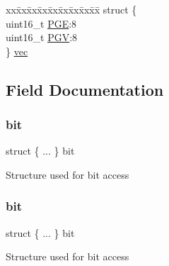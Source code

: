\begin{DoxyCompactItemize}
\begin{tabbing}
\end{tabbing}\item 
\begin{tabbing}
xx\=xx\=xx\=xx\=xx\=xx\=xx\=xx\=xx\=\kill
struct \{\\
\>uint16\_t \mbox{\hyperlink{union_t_c_c___p_a_t_t___type_ab341e20d9b809d928401d2394db56ce0}{PGE}}:8\\
\>uint16\_t \mbox{\hyperlink{union_t_c_c___p_a_t_t___type_af21d899ca984d45bb3d0ea03b889c773}{PGV}}:8\\
\} \mbox{\hyperlink{union_t_c_c___p_a_t_t___type_a2d12389f004832d3435d45c62a830574}{vec}}\\

\end{tabbing}\end{DoxyCompactItemize}


\subsection{Field Documentation}
\mbox{\label{union_t_c_c___p_a_t_t___type_aa8d6a3e59d8a67f22246a420170fe035}} 
\subsubsection{\texorpdfstring{bit}{bit}\hspace{0.1cm}{\footnotesize\ttfamily [1/2]}}
{\footnotesize\ttfamily struct \{ ... \}   bit}

Structure used for bit access \mbox{\label{union_t_c_c___p_a_t_t___type_ab6dc5cca26bc845133c05405993f20c7}} 
\subsubsection{\texorpdfstring{bit}{bit}\hspace{0.1cm}{\footnotesize\ttfamily [2/2]}}
{\footnotesize\ttfamily struct \{ ... \}   bit}

Structure used for bit access \mbox{\label{union_t_c_c___p_a_t_t___type_ab341e20d9b809d928401d2394db56ce0}} 
